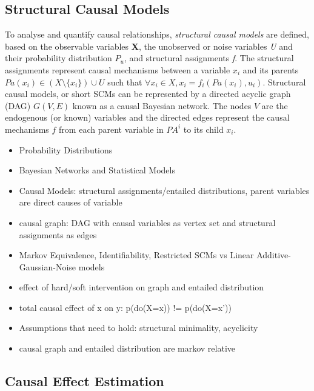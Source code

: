 \subsection{Structural Causal Models}
To analyse and quantify causal relationships, \textit{structural causal models} are defined, based on the observable variables \textbf{X}, the unobserved or noise variables \textit{U} and their probability distribution $P_u$, and structural assignments \textit{f}. The structural assignments represent causal mechanisms between a variable $x_i$ and its parents $Pa(x_i) \in (X \setminus \{x_i\}) \cup U$  such that $\forall x_i \in X, x_i = f_i(Pa(x_i),u_i)$. 
Structural causal models, or short SCMs can be represented by a directed acyclic graph (DAG) $G(V,E)$ known as a causal Bayesian network. The nodes $V$ are the endogenous (or known) variables and the directed edges represent the causal mechanisms $f$ from each parent variable in $PA^i$ to its child $x_i$.  

\begin{itemize}
    \item Probability Distributions
    \item Bayesian Networks and Statistical Models
    \item Causal Models: structural assignments/entailed distributions, parent variables are direct causes of variable 
    \item causal graph: DAG with causal variables as vertex set and structural assignments as edges
    \item Markov Equivalence, Identifiability, Restricted SCMs vs Linear Additive-Gaussian-Noise models
    \item effect of hard/soft intervention on graph and entailed distribution
    \item total causal effect of x on y: p(do(X=x)) != p(do(X=x'))
    \item Assumptions that need to hold: structural minimality, acyclicity
    \item causal graph and entailed distribution are markov relative
\end{itemize}

\subsection{Causal Effect Estimation}

